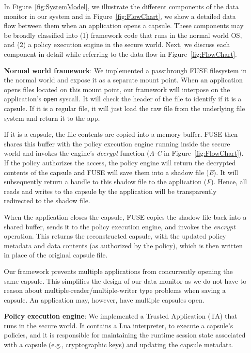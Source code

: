 In Figure~\ref{fig:SystemModel}, we illustrate the different components of the
data monitor in our system and in Figure~\ref{fig:FlowChart}, we show a detailed
data flow between them when an application opens a capsule. These components may
be broadly classified into (1) framework code that runs in the normal world OS,
and (2) a policy execution engine in the secure world. Next, we discuss
each component in detail while referring to the data flow in
Figure~\ref{fig:FlowChart}.

{\bf Normal world framework}: We implemented a passthrough FUSE filesystem in
the normal world and expose it as a separate mount point. When an application
opens files located on this mount point, our framework will interpose on the
application's {\tt open} syscall. It will check the header of the file to
identify if it is a capsule. If it is a regular file, it will just load the raw
file from the underlying file system and return it to the app.

If it is a capsule, the file contents are copied into a memory buffer. FUSE then
shares this buffer with the policy execution engine running inside the secure world
and invokes the engine's {\em decrypt} function ({\em A}-{\em C} in
Figure~\ref{fig:FlowChart}). If the policy authorizes the access, the policy
engine will return the decrypted contents of the capsule and FUSE will save them
into a shadow file ({\em E}). It will subsequently return a handle to this
shadow file to the application ({\em F}). Hence, all reads and writes to the
capsule by the application will be transparently redirected to the shadow file.

When the application closes the capsule, FUSE copies the shadow file back into a
shared buffer, sends it to the policy execution engine, and invokes the {\em encrypt}
operation. This returns the reconstructed capsule, with the updated policy
metadata and data contents (as authorized by the policy), which is then written
in place of the original capsule file.

Our framework prevents multiple applications from concurrently opening the same
capsule. This simplifies the design of our data monitor as we do not have to
reason about multiple-reader/multiple-writer type problems when saving a
capsule. An application may, however, have multiple capsules open.

    {\bf Policy execution engine}: We implemented a Trusted Application (TA) that
runs in the secure world. It contains a Lua interpreter, to execute
a capsule's policies, and it is responsible for maintaining the runtime session
state associated with a capsule (e.g., cryptographic keys) and updating the
capsule metadata.

